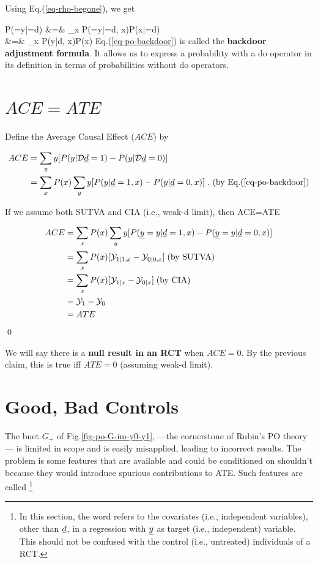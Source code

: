 Using Eq.(\ref{eq-rho-begone}), we get

\beqa
P(\rvy=y|\cald\rvd=d)
&=&
\sum_x
P(\rvy=y|\cald\rvd=d, x)P(x|\cald\rvd=d)
\\
&=&
\sum_x
P(y|d, x)P(x)
\label{eq-po-backdoor}
\eeqa
Eq.(\ref{eq-po-backdoor})
is called the {\bf backdoor adjustment formula}.
It allows us to
express a
probability
with a do operator
in its definition
in terms
of  probabilities
without do operators.

\section{$ACE=ATE$}



Define the Average
Causal Effect ($ACE$) by

\begin{align}
ACE&=\sum_y y
[P(y|\cald\rvd=1)-P(y|\cald\rvd=0)]
\\
&=
\sum_x P(x)\sum_y y [P(y|\rvd=1,x)-P(y|\rvd=0,x)]
\;. \text{ (by Eq.(\ref{eq-po-backdoor})}
\label{eq-my-backdoor-proof}
\end{align}


\begin{claim}\label{cl-ace-ate}
If we assume both SUTVA and
CIA (i.e., weak-d limit), then
\beq
ACE=ATE
\eeq
\end{claim}
\proof



\begin{align}
ACE&=
\sum_x P(x)\sum_y y [P(\rvy=y|\rvd=1,x)-
P(\rvy=y|\rvd=0,x)]
\\
&=\sum_x P(x)[\caly_{1|1, x}-\caly_{0|0, x}]
\;\text{(by SUTVA)}
\\
&=\sum_x P(x)[\caly_{1|x}-\caly_{0|x}]
\;\text{(by CIA)}
\\
&=
\caly_{1}-\caly_{0}
\\
&=
ATE
\end{align}
\qed

We will say there is a {\bf null result
in an RCT} when $ACE=0$. By the previous claim,
this is true iff $ATE=0$
(assuming weak-d limit).

\section{Good, Bad Controls}

The bnet $G_+$
of Fig.\ref{fig-po-G-im-y0-y1},
---the cornerstone of Rubin's
PO theory--- is limited in scope
and is easily
misapplied, leading
to incorrect results.
The problem is
some features
that are available
and could be conditioned on
shouldn't because they
would introduce spurious
contributions to ATE.
Such features are called
\footnote{
In this section,
the word 
refers to the covariates
(i.e., independent
variables),
other than $\rvd$,
in a regression
with $\rvy$  as target
(i.e., independent)
variable.
This should
not be confused
with the
control
(i.e., untreated)
individuals
of a RCT.}

